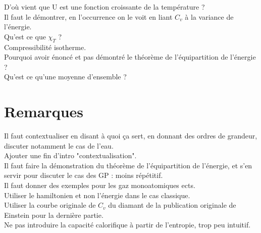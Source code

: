 \documentclass[12pt,prb,aps,epsf]{article}
\begin{document}
D'où vient que U est une fonction croissante de la température ?\\
Il faut le démontrer, en l'occurrence on le voit en liant $C_v$ à la variance de l'énergie.\\

Qu'est ce que $\chi_T$ ?\\
Compressibilité isotherme.\\

Pourquoi avoir énoncé et pas démontré le théorème de l'équipartition de l'énergie ?\\

Qu'est ce qu'une moyenne d'ensemble ?

\section*{Remarques}
Il faut contextualiser en disant à quoi ça sert, en donnant des ordres de grandeur, discuter notamment le cas de l'eau.\\
Ajouter une fin d'intro "contextualisation".\\
Il faut faire la démonstration du théorème de l'équipartition de l'énergie, et s'en servir pour discuter le cas des GP : moins répétitif.\\
Il faut donner des exemples pour les gaz monoatomiques ects.\\
Utiliser le hamiltonien et non l'énergie dans le cas classique.\\
Utiliser la courbe originale de $C_v$ du diamant de la publication originale de Einstein pour la dernière partie.\\
Ne pas introduire la capacité calorifique à partir de l'entropie, trop peu intuitif.
\end{document}

